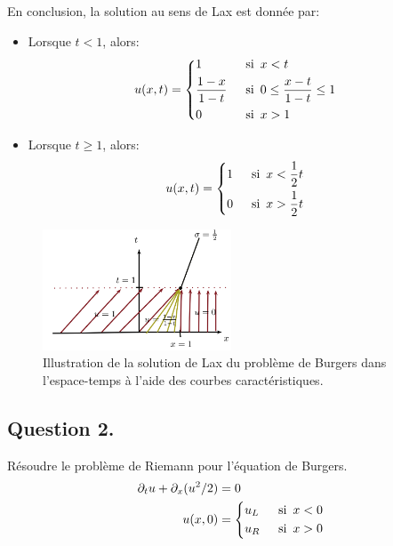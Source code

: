 \documentclass[
	french,
	11pt, %
]{fphw}
\newcommand{\hquad}{\hspace{0.5em}} %
\begin{document}
\noindent En conclusion, la solution au sens de Lax est donnée par:
\begin{itemize}[label=$\blacksquare$]
	\item Lorsque $t<1$, alors:
	\begin{align*}
		u(x, t) &= 
		\begin{dcases}
			1 \hquad & \text{si} \hquad x<t \\	
			\frac{1-x}{1-t} \hquad & \text{si} \hquad 0 \leq \frac{x-t}{1-t} \leq 1 \\	
			0 \hquad & \text{si} \hquad x>1
		\end{dcases}
	\end{align*}
	\item Lorsque $ t \geq 1 $, alors:
	\begin{align*}
		u(x, t) &= 
		\begin{dcases}
			1 \hquad & \text{si} \hquad x<\frac{1}{2}t \\	
			0 \hquad & \text{si} \hquad x>\frac{1}{2}t
		\end{dcases}
	\end{align*}
\end{itemize}

\begin{figure}[h]
	\centering
	\includegraphics[width=0.5\textwidth]{Burgers1}
	\captionsetup{justification=centering}
	\caption{Illustration de la solution de Lax du problème de Burgers dans l'espace-temps à l'aide des courbes caractéristiques.}
	\label{fig:IllusBurg}
\end{figure}


\subsection*{Question 2.}
\begin{problem}
	Résoudre le problème de Riemann pour l'équation de Burgers.
	\begin{align}
		\label{Riemann}
			\partial_t u + \partial_x (u^2/2) &= 0 \\
			\nonumber u(x, 0) &= 
			\begin{dcases}
				u_L \hquad & \text{si} \hquad x<0 \\	
				u_R \hquad & \text{si} \hquad x>0
			\end{dcases}
	\end{align}
\end{problem}
\end{document}

